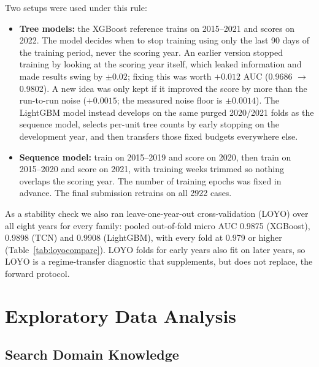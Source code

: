 \documentclass{article}
\begin{document}
Two setups were used under this rule:
\begin{itemize}
    \item \textbf{Tree models:} the XGBoost reference trains on
    2015--2021 and scores on 2022. The model decides when to stop training
    using only the last 90 days of the training period, never the scoring
    year. An earlier version stopped training by looking at the scoring
    year itself, which leaked information and made results swing by
    $\pm 0.02$; fixing this was worth $+0.012$ AUC (0.9686 $\to$ 0.9802).
    A new idea was only kept if it improved the score by more than the
    run-to-run noise ($+0.0015$; the measured noise floor is
    $\pm 0.0014$). The LightGBM model instead develops on the same purged
    2020/2021 folds as the sequence model, selects per-unit tree counts
    by early stopping on the development year, and then transfers those
    fixed budgets everywhere else.
    \item \textbf{Sequence model:} train on 2015--2019 and score on 2020,
    then train on 2015--2020 and score on 2021, with training weeks
    trimmed so nothing overlaps the scoring year. The number of training
    epochs was fixed in advance. The final submission retrains on all
    2922 cases.
\end{itemize}

As a stability check we also ran leave-one-year-out cross-validation
(LOYO) over all eight years for every family: pooled out-of-fold micro
AUC 0.9875 (XGBoost), 0.9898 (TCN) and 0.9908 (LightGBM), with every
fold at 0.979 or higher (Table~\ref{tab:loyocompare}). LOYO folds for
early years also fit on later years, so LOYO is a regime-transfer
diagnostic that supplements, but does not replace, the forward protocol.

\section{Exploratory Data Analysis}
\subsection{Search Domain Knowledge}
\label{sec:domain}
\end{document}
